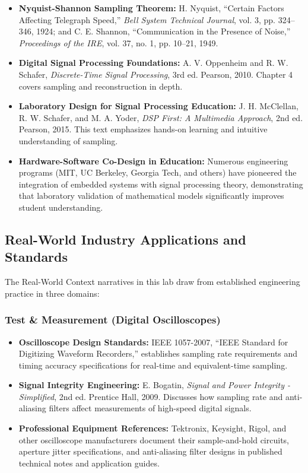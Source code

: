 \documentclass[11pt,letterpaper]{article}
\begin{document}
\begin{itemize}
    \item \textbf{Nyquist-Shannon Sampling Theorem:} H. Nyquist, ``Certain Factors Affecting Telegraph Speed,'' \textit{Bell System Technical Journal}, vol. 3, pp. 324--346, 1924; and C. E. Shannon, ``Communication in the Presence of Noise,'' \textit{Proceedings of the IRE}, vol. 37, no. 1, pp. 10--21, 1949.

    \item \textbf{Digital Signal Processing Foundations:} A. V. Oppenheim and R. W. Schafer, \textit{Discrete-Time Signal Processing}, 3rd ed. Pearson, 2010. Chapter 4 covers sampling and reconstruction in depth.

    \item \textbf{Laboratory Design for Signal Processing Education:} J. H. McClellan, R. W. Schafer, and M. A. Yoder, \textit{DSP First: A Multimedia Approach}, 2nd ed. Pearson, 2015. This text emphasizes hands-on learning and intuitive understanding of sampling.

    \item \textbf{Hardware-Software Co-Design in Education:} Numerous engineering programs (MIT, UC Berkeley, Georgia Tech, and others) have pioneered the integration of embedded systems with signal processing theory, demonstrating that laboratory validation of mathematical models significantly improves student understanding.
\end{itemize}

\subsection*{Real-World Industry Applications and Standards}

The Real-World Context narratives in this lab draw from established engineering practice in three domains:

\subsubsection*{Test \& Measurement (Digital Oscilloscopes)}

\begin{itemize}
    \item \textbf{Oscilloscope Design Standards:} IEEE 1057-2007, ``IEEE Standard for Digitizing Waveform Recorders,'' establishes sampling rate requirements and timing accuracy specifications for real-time and equivalent-time sampling.

    \item \textbf{Signal Integrity Engineering:} E. Bogatin, \textit{Signal and Power Integrity - Simplified}, 2nd ed. Prentice Hall, 2009. Discusses how sampling rate and anti-aliasing filters affect measurements of high-speed digital signals.

    \item \textbf{Professional Equipment References:} Tektronix, Keysight, Rigol, and other oscilloscope manufacturers document their sample-and-hold circuits, aperture jitter specifications, and anti-aliasing filter designs in published technical notes and application guides.
\end{itemize}
\end{document}
